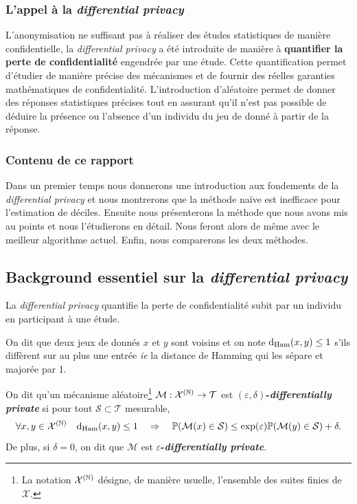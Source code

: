 \subsubsection{L'appel à la \textit{differential privacy}}

L'anonymisation ne suffisant pas à réaliser des études statistiques de manière confidentielle, la \textit{differential privacy} \cite{10.1007/11681878_14} a été introduite de manière à \textbf{quantifier la perte de confidentialité} engendrée par une étude. Cette quantification permet d'étudier de manière précise des mécanismes et de fournir des réelles garanties mathématiques de confidentialité. L'introduction d'aléatoire permet de donner des réponses statistiques précises tout en assurant qu'il n'est pas possible de déduire la présence ou l'absence d'un individu du jeu de donné à partir de la réponse.

\subsubsection{Contenu de ce rapport}

Dans un premier temps nous donnerons une introduction aux fondements de la \textit{differential privacy} et nous montrerons que la méthode naïve est inefficace pour l'estimation de déciles. Ensuite nous présenterons la méthode que nous avons mis au points et nous l'étudierons en détail. Nous feront alors de même avec le meilleur algorithme actuel. Enfin, nous comparerons les deux méthodes.

\subsection{Background essentiel sur la \textit{differential privacy}}

La \textit{differential privacy} \cite{10.1007/11681878_14} quantifie la perte de confidentialité subit par un individu en participant à une étude. 

\begin{definition}
    On dit que deux jeux de donnés \(x\) et \(y\) sont voisins et on note \(\mathrm{d}_{\text{Ham}}(x,y) \leq 1\) s'ils diffèrent sur au plus une entrée \textit{ie} la distance de {\sc Hamming} qui les sépare et majorée par 1.
\end{definition}
 

\begin{definition}
    On dit qu'un mécanisme aléatoire\footnote{La notation \(\mathcal X^{(\mathbb{N})}\) désigne, de manière usuelle, l'ensemble des suites finies de \(\mathcal X\).} \(\mathcal M :\mathcal X^{(\mathbb{N})} \to \mathcal T\) est \textbf{\((\varepsilon, \delta)\)-\textit{differentially private}} si pour tout \(\mathcal S \subset \mathcal T \) mesurable, 
    \[
        \forall x,y \in \mathcal X^{(\mathbb{N})} \quad \mathrm{d}_{\text{Ham}}(x,y) \leq 1 \quad \Rightarrow \quad \mathbb P(\mathcal M(x) \in \mathcal S) \leq \exp(\varepsilon)  \mathbb P(\mathcal M(y) \in \mathcal S) + \delta.
    \] 
    De plus, si \(\delta = 0\), on dit que \(\mathcal M\) est \textbf{\(\varepsilon\)-\textit{differentially private}}. 
\end{definition}

